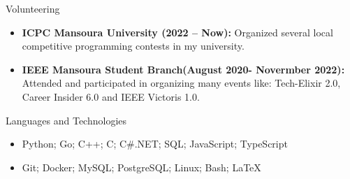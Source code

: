 \documentclass[]{cv}
\begin{document}
	\begin{cvsection}{Volunteering}
				\vspace{3mm}

		\begin{cvsubsection}{}{}{}	
			\begin{itemize}
				\item \textbf{ICPC Mansoura University (2022 – Now):} Organized several local competitive programming contests in my university.
				\item \textbf{IEEE Mansoura Student Branch(August 2020- Novermber 2022):} Attended and participated in organizing many events like: Tech-Elixir 2.0, Career Insider 6.0 and 
IEEE Victoris 1.0. 
			\end{itemize}
		\end{cvsubsection}
	\end{cvsection}


	\begin{cvsection}{Languages and Technologies}
					\vspace{3mm}

		\begin{cvsubsection}{}{}{}	
			\begin{itemize}
				\item Python; Go; C++; C; C\#.NET; SQL; JavaScript; TypeScript 
				\item Git; Docker; MySQL; PostgreSQL; Linux; Bash; LaTeX
			\end{itemize}
		\end{cvsubsection}
	\end{cvsection}
	
\end{document}
